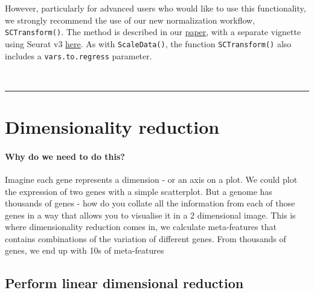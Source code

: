 \documentclass[
]{book}
\begin{document}
However, particularly for advanced users who would like to use this functionality, we strongly recommend the use of our new normalization workflow, \texttt{SCTransform()}. The method is described in our \href{https://genomebiology.biomedcentral.com/articles/10.1186/s13059-019-1874-1}{paper}, with a separate vignette using Seurat v3 \href{sctransform_vignette.html}{here}. As with \texttt{ScaleData()}, the function \texttt{SCTransform()} also includes a \texttt{vars.to.regress} parameter.

~

\begin{center}\rule{0.5\linewidth}{0.5pt}\end{center}

\hypertarget{dimensionality-reduction}{%
\chapter{Dimensionality reduction}\label{dimensionality-reduction}}

\hypertarget{why-do-we-need-to-do-this-4}{%
\subsubsection*{Why do we need to do this?}\label{why-do-we-need-to-do-this-4}}

Imagine each gene represents a dimension - or an axis on a plot. We could plot the expression of two genes with a simple scatterplot. But a genome has thousands of genes - how do you collate all the information from each of those genes in a way that allows you to visualise it in a 2 dimensional image. This is where dimensionality reduction comes in, we calculate meta-features that contains combinations of the variation of different genes. From thousands of genes, we end up with 10s of meta-features

\hypertarget{section-6}{%
\subsubsection*{}\label{section-6}}

\hypertarget{perform-linear-dimensional-reduction}{%
\section{Perform linear dimensional reduction}\label{perform-linear-dimensional-reduction}}
\end{document}
